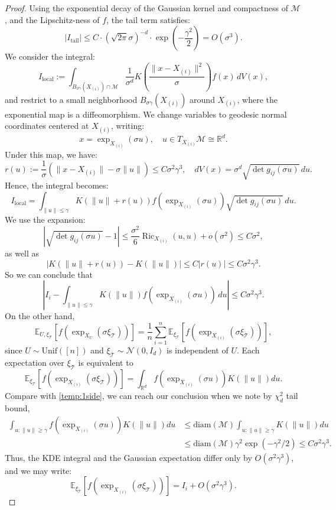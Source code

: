 \documentclass{article}
\def\calM{\mathcal{M}}
\begin{document}
\begin{proof}
Using the exponential decay of the Gaussian kernel and compactness of \(\mathcal{M}\), and the Lipschitz-ness of $f$,
the tail term satisfies:
\[
|I_{\text{tail}}| \le C \cdot (\sqrt{2\pi}\sigma)^{-d} \cdot \exp\left( - \frac{\gamma^2}{2} \right) = O(\sigma^3).
\] 
We consider the integral:
\[
I_{\text{local}} := \int_{B_{\sigma \gamma}(X_{(i)})\cap \calM} \frac{1}{\sigma^d} K\left( \frac{\|x-X_{(i)}\|^2}{\sigma} \right) f(x) \, dV(x),
\]
and restrict to a small neighborhood \( B_{\sigma \gamma}(X_{(i)}) \) around \(X_{(i)}\), where the exponential map is a diffeomorphism. We change variables to geodesic normal coordinates centered at \(X_{(i)}\), writing:
\[
x = \exp_{X_{(i)}}(\sigma u), \quad u \in T_{X_{(i)}} \mathcal{M} \cong \mathbb{R}^d.
\]
Under this map, we have:
\[
r(u):=\frac{1}{\sigma}(\|x-X_{(i)}\| -\sigma \|u\|)\leq C\sigma^2\gamma^3, \quad  dV(x) = \sigma^d \sqrt{\det g_{ij}(\sigma u)} \, du.
\]
Hence, the integral becomes:
\[
I_{\text{local}}=\int_{\|u\| \le \gamma} K(\|u\|+r(u)) f(\exp_{X_{(i)}}(\sigma u)) \sqrt{\det g_{ij}(\sigma u)} \, du.
\]
We use the expansion:
\[
|\sqrt{\det g_{ij}(\sigma u)} - 1|\leq  \frac{\sigma^2}{6} \operatorname{Ric}_{X_{(i)}}(u, u) + o(\sigma^2)\leq C\sigma^2,
\]
as well as
\[
|K(\|u\|+r(u))-K(\|u\|)|\leq C |r(u)|\leq C\sigma^2\gamma^3.
\]
So we can conclude that 
\begin{equation}
\label{temp:1side}
\left|I_i- \int_{\|u\| \le \gamma} K(\|u\|) f(\exp_{X_{(i)}}(\sigma u)) \, du\right|\leq C\sigma^2 \gamma^3.
\end{equation}
On the other hand,
\[
\mathbb{E}_{U, \xi_{\mathcal{T}}}[f(\exp_{X_U}(\sigma \xi_{\mathcal{T}}))] = \frac{1}{n} \sum_{i=1}^n \mathbb{E}_{\xi_{\mathcal{T}}}[f(\exp_{X_{(i)}}(\sigma \xi_{\mathcal{T}}))],
\]
since \( U \sim \mathrm{Unif}([n]) \) and \( \xi_{\mathcal{T}} \sim \mathcal{N}(0, I_d) \) is independent of $U$. Each expectation over \( \xi_{\mathcal{T}} \) is equivalent to
\[
\mathbb{E}_{\xi_{\mathcal{T}}}[f(\exp_{X_{(i)}}(\sigma \xi_{\mathcal{T}}))] = \int_{\mathbb{R}^d} f(\exp_{X_{(i)}}(\sigma u)) K(\|u\|) du. 
\]
Compare with \eqref{temp:1side}, we can reach our conclusion when we note by $\chi^2_d$ tail bound, 
\begin{align*}
\int_{u:\|u\|\geq \gamma} f(\exp_{X_{(i)}}(\sigma u)) K(\|u\|) du&\leq \text{diam}(\calM)\int_{u:\|u\|\geq \gamma}  K(\|u\|) du\\
&\leq \text{diam}(\calM) \gamma^2\exp(-\gamma^2/2)\leq C\sigma^2\gamma^3. 
\end{align*}
Thus, the KDE integral and the Gaussian expectation differ only by \(O(\sigma^2\gamma^3)\), and we may write:
\[
\mathbb{E}_{\xi_{\mathcal{T}}}[f(\exp_{X_{(i)}}(\sigma \xi_{\mathcal{T}}))] = I_i + O(\sigma^2\gamma^3).
\]


\end{proof}
\end{document}
